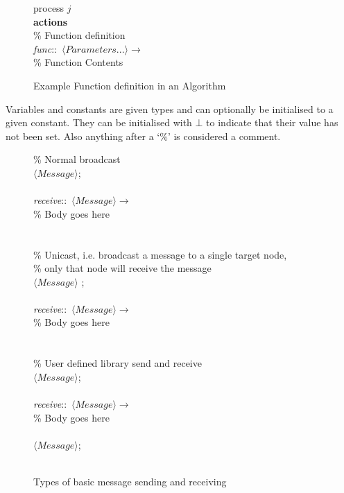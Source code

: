 \begin{figure}[H]
  \centering
  \begin{boxedminipage}{\linewidth}
    \null process $j$\\
    \null \textbf{actions}\\
    \null\qq \% Function definition\\
    \null\qq \emph{func}::~$\langle Parameters...\rangle \rightarrow$\\
    \null\qq\qq \% Function Contents\\
  \end{boxedminipage}
  \caption{Example Function definition in an Algorithm}
  \label{FuncAlgoEg}
\end{figure}


Variables and constants are given types and can optionally be initialised to a given constant. They can be initialised with $\bot$ to indicate that their value has not been set. Also anything after a `$\%$' is considered a comment.


\begin{figure}[H]
  \centering
  \begin{boxedminipage}{\linewidth}
    \null\qq \% Normal broadcast \\
    \null\qq {}$\langle Message\rangle$;\\~\\
    \null\qq \emph{receive}::~$\langle Message\rangle \rightarrow$\\
    \null\qq\qq \% Body goes here\\~\\~\\
    \null\qq \% Unicast, i.e. broadcast a message to a single target node,\\
    \null\qq \% only that node will receive the message \\
    \null\qq {}$\langle Message\rangle$  ;\\~\\
    \null\qq \emph{receive}::~$\langle Message\rangle \rightarrow$\\
    \null\qq\qq \% Body goes here\\~\\~\\
    \null\qq \% User defined library send and receive \\
    \null\qq {}$\langle Message\rangle$;\\~\\
    \null\qq \emph{receive}::~$\langle Message\rangle \rightarrow$\\
    \null\qq\qq \% Body goes here\\~\\
    \null\qq {}$\langle Message\rangle$;\\~\\
  \end{boxedminipage}
  \caption{Types of basic message sending and receiving}
  \label{BCASTEg}
\end{figure}


